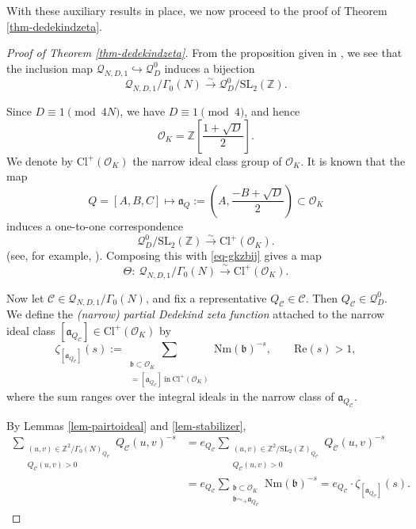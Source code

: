 \documentclass[12pt]{amsart}
\numberwithin{equation}{section}
\theoremstyle{definition}
\begin{document}
With these auxiliary results in place, we now proceed to the proof of Theorem \ref{thm-dedekindzeta}.

\begin{proof}[Proof of Theorem \ref{thm-dedekindzeta}]
From the proposition given in \cite[p. 505]{GKZ87}, we see that the inclusion map $\mathcal{Q}_{N,D,1}\hookrightarrow\mathcal{Q}_{D}^{0}$ induces a bijection
\begin{equation}\label{eq-gkzbij}
    \mathcal{Q}_{N,D,1}/\Gamma_{0}(N)\xrightarrow{\sim}\mathcal{Q}_{D}^{0}/\mathrm{SL}_{2}(\mathbb{Z}).
\end{equation}

Since $D\equiv 1\pmod{4N}$, we have $D\equiv 1\pmod{4}$, and hence
$$\mathcal{O}_{K}=\mathbb{Z}\left[\frac{1+\sqrt{D}}{2}\right].$$
We denote by $\mathrm{Cl}^{+}(\mathcal{O}_{K})$ the narrow ideal class group of $\mathcal{O}_{K}$.
It is known that the map
$$Q=[A,B,C]\mapsto\mathfrak{a}_{Q}:=\left(A,\frac{-B+\sqrt{D}}{2}\right)\subset\mathcal{O}_{K}$$
induces a one-to-one correspondence
$$\mathcal{Q}_{D}^{0}/\mathrm{SL}_{2}(\mathbb{Z})\xrightarrow{\sim} \mathrm{Cl}^{+}(\mathcal{O}_{K}).$$
(see, for example, \cite{FT93}). Composing this with \eqref{eq-gkzbij} gives a map
$$\Theta:\ \mathcal{Q}_{N,D,1}/\Gamma_{0}(N)\xrightarrow{\sim} \mathrm{Cl}^{+}(\mathcal{O}_{K}).$$

Now let $\mathcal{C}\in\mathcal{Q}_{N,D,1}/\Gamma_{0}(N)$, and fix a representative $Q_{\mathcal{C}}\in\mathcal{C}$. Then $Q_{\mathcal{C}}\in\mathcal{Q}_{D}^{0}$. We define the \emph{(narrow) partial Dedekind zeta function}
attached to the narrow ideal class $[\mathfrak{a}_{Q_{\mathcal{C}}}]\in\mathrm{Cl}^{+}(\mathcal O_K)$ by
\begin{equation}\label{eq:def-narrow-partial-zeta}
\zeta_{[\mathfrak{a}_{Q_{\mathcal{C}}}]}(s)
:=\sum\limits_{\substack{\mathfrak{b}\subset\mathcal{O}_{K} \\ [\mathfrak{b}]=[\mathfrak{a}_{Q_{\mathcal{C}}}]~\text{in}~\mathrm{Cl}^{+}(\mathcal{O}_{K})}}
\mathrm{Nm}(\mathfrak b)^{-s},
\qquad \mathrm{Re}(s)>1,
\end{equation}
where the sum ranges over the integral ideals in the narrow class of $\mathfrak{a}_{Q_{\mathcal{C}}}$.

By Lemmas \ref{lem-pairtoideal} and \ref{lem-stabilizer},
\begin{align}
    \sum\limits_{\substack{(u,v)\in\mathbb{Z}^{2}/\Gamma_{0}(N)_{Q_{\mathcal{C}}} \\ Q_{\mathcal{C}}(u,v)>0}}Q_{\mathcal{C}}(u,v)^{-s}
    &=e_{Q_{\mathcal{C}}}\sum\limits_{\substack{(u,v)\in\mathbb{Z}^{2}/\mathrm{SL}_{2}(\mathbb{Z})_{Q_{\mathcal{C}}} \\ Q_{\mathcal{C}}(u,v)>0}}Q_{\mathcal{C}}(u,v)^{-s}\nonumber\\
    &=e_{Q_{\mathcal{C}}}\sum\limits_{\substack{\mathfrak{b}\subset\mathcal{O}_{K} \\ \mathfrak{b}\sim_{+}\mathfrak{a}_{Q_{\mathcal{C}}}}}
    \mathrm{Nm}(\mathfrak{b})^{-s}
    =e_{Q_{\mathcal{C}}}\cdot\zeta_{[\mathfrak{a}_{Q_{\mathcal{C}}}]}(s).\label{eq-classidealzeta}
\end{align}


\end{proof}
\end{document}
